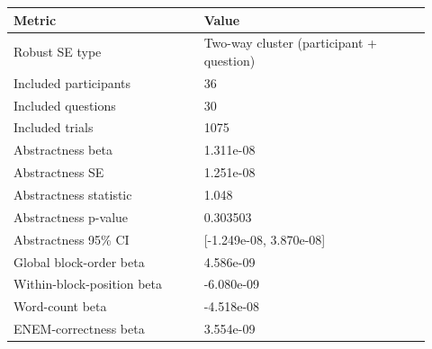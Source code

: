 \begin{tabular}{p{0.42\linewidth}p{0.50\linewidth}}
\toprule
Metric & Value\\
\midrule
Robust SE type & Two-way cluster (participant + question)\\
Included participants & 36\\
Included questions & 30\\
Included trials & 1075\\
Abstractness beta & 1.311e-08\\
Abstractness SE & 1.251e-08\\
Abstractness statistic & 1.048\\
Abstractness p-value & 0.303503\\
Abstractness 95\% CI & [-1.249e-08, 3.870e-08]\\
Global block-order beta & 4.586e-09\\
Within-block-position beta & -6.080e-09\\
Word-count beta & -4.518e-08\\
ENEM-correctness beta & 3.554e-09\\
\bottomrule
\end{tabular}
